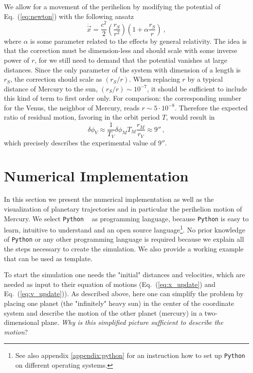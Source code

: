 \documentclass[12pt]{iopart}
\newcommand{\python}[0]{\texttt{Python} }
\begin{document}
We allow for a movement of the perihelion by modifying the potential of Eq.~(\ref{eq:newton}) with the following ansatz
\begin{equation}
\ddot{\vec x} = \frac{c^2}{2}\left(\frac{r_S}{r^2}\right)\left(1+\alpha\frac{r_S}{r}\right) \ ,
\label{eq:newton_art}
\end{equation}
where $\alpha$ is some parameter related to the effects by general relativity.
The idea is that the correction must be dimension-less and should scale with some inverse power of $r$, for we still need to demand that the potential vanishes at large distances.
Since the only parameter of the system with dimension of a length is $r_S$, the correction should scale as $(r_S/r)$.
When replacing $r$ by a typical distance of Mercury to the sun, $(r_S/r)\sim 10^{-7}$, it should be sufficient to include this kind of term to first order only.
For comparison: the corresponding number for the Venus, the neighbor of Mercury, reads $r \sim 5 \cdot 10^{-8}$.
Therefore the expected ratio of residual motion, favoring in the orbit period $T$, would result in
\begin{equation}
	\delta \phi_V \approx \frac{1}{T_V} \delta \phi_M T_M \frac{r_M}{r_V} \approx 9'' \, ,
\end{equation}
which precisely describes the experimental value of $9''$.



\section{Numerical Implementation}
\label{sec:Numerical Implementation}
In this section we present the numerical implementation as well as the visualization of planetary trajectories and in
particular
  the perihelion motion of Mercury.  We select \python~\cite{} as  programming language, because \python is easy to learn, 
  intuitive to understand and an open source language\footnote{See also appendix \ref{appendix:python} for an instruction 
  how to set up \python on different operating systems.}.  No prior knowledge of \python or any other programming language 
  is required because we explain all the steps necessary to create the simulation.  We also provide a working 
  example \cite{} that can be used as template.

To start the simulation one needs the "initial" distances and velocities, which are needed as input to their equation of motions (Eq.~(\ref{eq:x_update}) and Eq.~(\ref{eq:v_update})).  As described above, here  one can simplify the problem by placing one planet (the "infinitely" heavy sun) in the center of the coordinate system and describe the motion of the other planet (mercury) in a two-dimensional plane.  \textit{Why is this simplified picture sufficient to describe the motion}?
\end{document}

